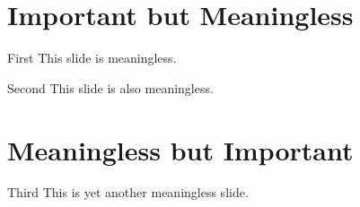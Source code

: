 \documentclass[17pt]{beamer} %
\begin{document}
\section{Important but Meaningless}
\begin{frame}{First}
This slide \pause is \alert{meaningless}.
\end{frame}
\begin{frame}{Second}
This slide \pause is also \alert{meaningless}.
\end{frame}

\section{Meaningless but Important}
\begin{frame}{Third}
This is yet another \alert{meaningless} slide.
\end{frame}
\end{document}

